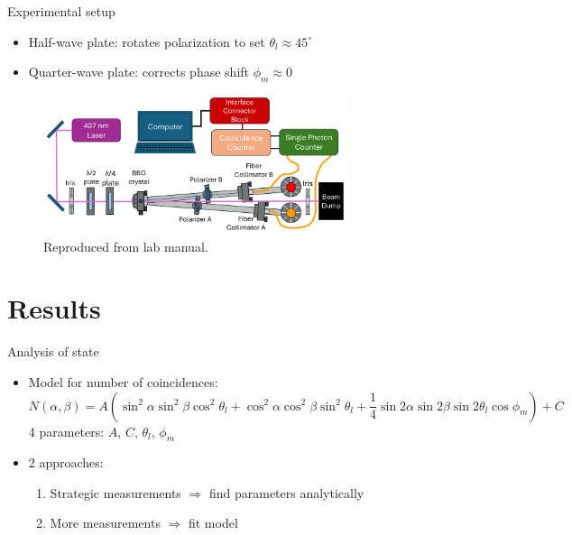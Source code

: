 \documentclass{../talk}
\renewcommand{\deg}{^\circ}
\begin{document}
\begin{frame}{Experimental setup}
  \begin{itemize}
    \item Half-wave plate: rotates polarization to set $\theta_l \approx 45\deg$
    \item Quarter-wave plate: corrects phase shift $\phi_m \approx 0$
  \end{itemize}
  \begin{figure}
    \centering
    \includegraphics[width=0.8\textwidth]{assets/setup.png}
    \caption{Reproduced from lab manual.}
  \end{figure}
\end{frame}

\section{Results}

\begin{frame}{Analysis of state}
  \begin{itemize}
    \item Model for number of coincidences:
      \begin{equation}
        N(\alpha,\beta) = A (\sin^2\alpha \sin^2\beta \cos^2\theta_l + \cos^2\alpha \cos^2\beta \sin^2\theta_l + \frac{1}{4} \sin2\alpha \sin2\beta \sin2\theta_l \cos\phi_m) + C
      \end{equation}
      4 parameters: $A$, $C$, $\theta_l$, $\phi_m$
    \item 2 approaches:
      \begin{enumerate}
        \item Strategic measurements $\Rightarrow$ find parameters analytically
        \item More measurements $\Rightarrow$ fit model
      \end{enumerate}
  \end{itemize}
\end{frame}
\end{document}
